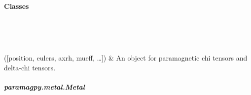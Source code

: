 \documentclass[a4paper,10pt,english,openany,oneside]{sphinxmanual}
\begin{document}
\paragraph{Classes}
\label{\detokenize{reference/metal:classes}}

\begin{savenotes}\sphinxatlongtablestart\begin{longtable}{}
\hline

\endfirsthead

%
{}\\
\hline

\endhead

\hline
{}\\
\endfoot

\endlastfoot

{\hyperref[\detokenize{reference/generated/paramagpy.metal.Metal:paramagpy.metal.Metal}]{}}({[}position, eulers, axrh, mueff, …{]})
&
An object for paramagnetic chi tensors and delta-chi tensors.
\\
\hline
\end{longtable}\sphinxatlongtableend\end{savenotes}


\subparagraph{paramagpy.metal.Metal}
\label{\detokenize{reference/generated/paramagpy.metal.Metal:paramagpy-metal-metal}}\label{\detokenize{reference/generated/paramagpy.metal.Metal::doc}}
\end{document}
